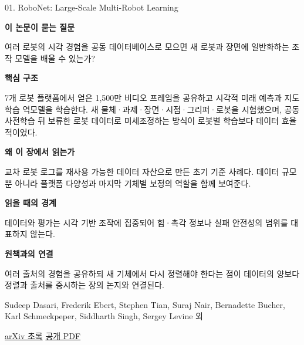 \documentclass[11pt,openany]{book}
\begin{document}
\begin{termcard}{01. RoboNet: Large-Scale Multi-Robot Learning}

\par

\medskip

{\sffamily\bfseries\color{deepblue} 이 논문이 묻는 질문}\par

여러 로봇의 시각 경험을 공동 데이터베이스로 모으면 새 로봇과 장면에 일반화하는 조작 모델을 배울 수 있는가?

\smallskip

{\sffamily\bfseries\color{deepblue} 핵심 구조}\par

7개 로봇 플랫폼에서 얻은 1,500만 비디오 프레임을 공유하고 시각적 미래 예측과 지도학습 역모델을 학습한다. 새 물체·과제·장면·시점·그리퍼·로봇을 시험했으며, 공동 사전학습 뒤 보류한 로봇 데이터로 미세조정하는 방식이 로봇별 학습보다 데이터 효율적이었다.

\smallskip

{\sffamily\bfseries\color{deepblue} 왜 이 장에서 읽는가}\par

교차 로봇 로그를 재사용 가능한 데이터 자산으로 만든 초기 기준 사례다. 데이터 규모뿐 아니라 플랫폼 다양성과 마지막 기체별 보정의 역할을 함께 보여준다.

\smallskip

{\sffamily\bfseries\color{coral} 읽을 때의 경계}\par

데이터와 평가는 시각 기반 조작에 집중되어 힘·촉각 정보나 실패 안전성의 범위를 대표하지 않는다.

\smallskip

{\sffamily\bfseries\color{teal} 원책과의 연결}\par

여러 출처의 경험을 공유하되 새 기체에서 다시 정렬해야 한다는 점이 데이터의 양보다 정렬과 출처를 중시하는 장의 논지와 연결된다.

\medskip

{\footnotesize\color{muted} Sudeep Dasari, Frederik Ebert, Stephen Tian, Suraj Nair, Bernadette Bucher, Karl Schmeckpeper, Siddharth Singh, Sergey Levine 외\par

\href{https://arxiv.org/abs/1910.11215}{arXiv 초록} \quad \href{https://arxiv.org/pdf/1910.11215}{공개 PDF}\par}

\end{termcard}
\end{document}
